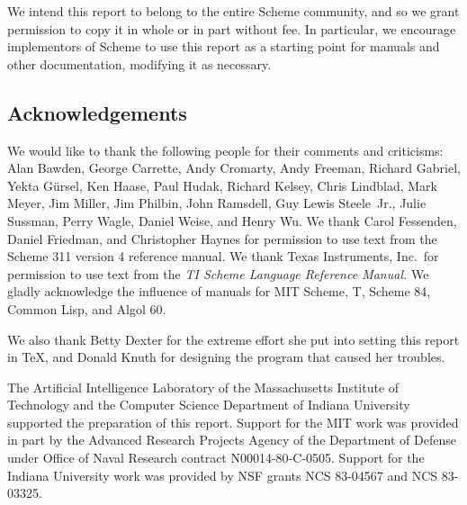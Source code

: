 

\medskip

We intend this report to belong to the entire Scheme community, and so
we grant permission to copy it in whole or in part without fee.  In
particular, we encourage implementors of Scheme to use this report as
a starting point for manuals and other documentation, modifying it as
necessary.




\subsection*{Acknowledgements}

We would like to thank the following people for their comments and
criticisms: Alan Bawden, George Carrette, Andy Cromarty,
Andy Freeman, Richard Gabriel, Yekta G\"ursel, Ken Haase, Paul Hudak,
Richard Kelsey, Chris Lindblad, Mark Meyer, Jim Miller, Jim Philbin,
John Ramsdell, Guy Lewis Steele~Jr., Julie Sussman, Perry Wagle, Daniel Weise, and
Henry Wu.  We thank Carol Fessenden, Daniel Friedman, and Christopher Haynes
for permission to use text from the Scheme 311 version 4 reference
manual.  We thank Texas Instruments, Inc.~for permission to use text
from the {\em TI Scheme Language Reference Manual.} We gladly
acknowledge the influence of manuals for MIT Scheme, T, Scheme 84,
Common Lisp, and Algol 60.

\vest We also thank Betty Dexter for the extreme effort she put into
setting this report in \TeX, and Donald Knuth for designing the program
that caused her troubles.

\vest The Artificial Intelligence Laboratory of the
Massachusetts Institute of Technology and the Computer Science
Department of Indiana University supported the preparation of this
report.  Support for the MIT work was provided in part by the Advanced
Research Projects Agency of the Department of Defense under Office of
Naval Research contract N00014-80-C-0505.  Support for the Indiana
University work was provided by NSF grants NCS 83-04567 and NCS
83-03325.


